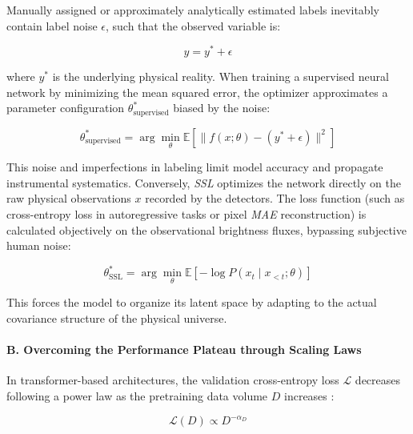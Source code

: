 Manually assigned or approximately analytically estimated labels inevitably contain label noise $\epsilon$, such that the observed variable is:

\begin{equation}
  y = y^* + \epsilon
  \label{eq:ruido_etiqueta}
\end{equation}

where $y^*$ is the underlying physical reality. When training a supervised neural network by minimizing the mean squared error, the optimizer approximates a parameter configuration $\theta^*_{\text{supervised}}$ biased by the noise:

\begin{equation}
  \theta^*_{\text{supervised}} = \arg\min_{\theta} \mathbb{E} \left[ \| f\left(x; \theta\right) - \left(y^* + \epsilon\right) \|^2 \right]
  \label{eq:opt_supervisada}
\end{equation}

This noise and imperfections in labeling limit model accuracy and propagate instrumental systematics. Conversely, \textit{\gls{SSL}} optimizes the network directly on the raw physical observations $x$ recorded by the detectors. The loss function (such as cross-entropy loss in autoregressive tasks or pixel \textit{\gls{MAE}} reconstruction) is calculated objectively on the observational brightness fluxes, bypassing subjective human noise:

\begin{equation}
  \theta^*_{\text{SSL}} = \arg\min_{\theta} \mathbb{E} \left[ -\log P\left(x_t \mid x_{<t}; \theta\right) \right]
  \label{eq:opt_ssl}
\end{equation}

This forces the model to organize its latent space by adapting to the actual covariance structure of the physical universe.

\paragraph{B. Overcoming the Performance Plateau through Scaling Laws}

In transformer-based architectures, the validation cross-entropy loss $\mathcal{L}$ decreases following a power law as the pretraining data volume $D$ increases \autocite{ar:kaplan-2020}:

\begin{equation}
  \mathcal{L}\left(D\right) \propto D^{-\alpha_D}
  \label{eq:ley_escala_datos}
\end{equation}


